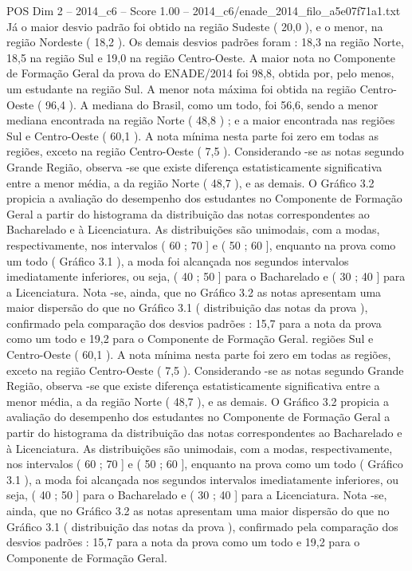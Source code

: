 \begin{textsample}{POS Dim 2 – 2014\_c6 – Score 1.00 – 2014\_c6/enade\_2014\_filo\_a5e07f71a1.txt}
Já o maior desvio padrão foi obtido na região Sudeste ( 20,0 ), e o menor, na região Nordeste ( 18,2 ).
Os demais desvios padrões foram : 18,3 na região Norte, 18,5 na região Sul e 19,0 na região Centro-Oeste.
A maior nota no Componente de Formação Geral da prova do ENADE/2014 foi 98,8, obtida por, pelo menos, um estudante na região Sul.
A menor nota máxima foi obtida na região Centro-Oeste ( 96,4 ).
A mediana do Brasil, como um todo, foi 56,6, sendo a menor mediana encontrada na região Norte ( 48,8 ) ; e a maior encontrada nas regiões Sul e Centro-Oeste ( 60,1 ).
A nota mínima nesta parte foi zero em todas as regiões, exceto na região Centro-Oeste ( 7,5 ).
Considerando -se as notas segundo Grande Região, observa -se que existe diferença estatisticamente significativa entre a menor média, a da região Norte ( 48,7 ), e as demais.
O Gráfico 3.2 propicia a avaliação do desempenho dos estudantes no Componente de Formação Geral a partir do histograma da distribuição das notas correspondentes ao Bacharelado e à Licenciatura.
As distribuições são unimodais, com a modas, respectivamente, nos intervalos ( 60 ; 70 ] e ( 50 ; 60 ], enquanto na prova como um todo ( Gráfico 3.1 ), a moda foi alcançada nos segundos intervalos imediatamente inferiores, ou seja, ( 40 ; 50 ] para o Bacharelado e ( 30 ; 40 ] para a Licenciatura.
Nota -se, ainda, que no Gráfico 3.2 as notas apresentam uma maior dispersão do que no Gráfico 3.1 ( distribuição das notas da prova ), confirmado pela comparação dos desvios padrões : 15,7 para a nota da prova como um todo e 19,2 para o Componente de Formação Geral. regiões Sul e Centro-Oeste ( 60,1 ).
A nota mínima nesta parte foi zero em todas as regiões, exceto na região Centro-Oeste ( 7,5 ).
Considerando -se as notas segundo Grande Região, observa -se que existe diferença estatisticamente significativa entre a menor média, a da região Norte ( 48,7 ), e as demais.
O Gráfico 3.2 propicia a avaliação do desempenho dos estudantes no Componente de Formação Geral a partir do histograma da distribuição das notas correspondentes ao Bacharelado e à Licenciatura.
As distribuições são unimodais, com a modas, respectivamente, nos intervalos ( 60 ; 70 ] e ( 50 ; 60 ], enquanto na prova como um todo ( Gráfico 3.1 ), a moda foi alcançada nos segundos intervalos imediatamente inferiores, ou seja, ( 40 ; 50 ] para o Bacharelado e ( 30 ; 40 ] para a Licenciatura.
Nota -se, ainda, que no Gráfico 3.2 as notas apresentam uma maior dispersão do que no Gráfico 3.1 ( distribuição das notas da prova ), confirmado pela comparação dos desvios padrões : 15,7 para a nota da prova como um todo e 19,2 para o Componente de Formação Geral.

\end{textsample}
